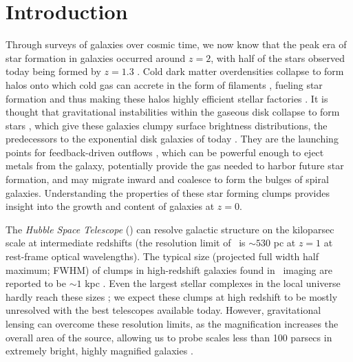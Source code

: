 \section{Introduction}

Through surveys of galaxies over cosmic time, we now know that the peak era of star formation in galaxies occurred around $z=2$, with half of the stars observed today being formed by $z=1.3$ \citep[][and references therein]{Madau:2014qd}. Cold dark matter overdensities collapse to form halos onto which cold gas can accrete in the form of filaments \citep{Keres:2005yq,Genzel:2006rt}, fueling star formation and thus making these halos highly efficient stellar factories \citep{Behroozi:2013vn}. It is thought that gravitational instabilities within the gaseous disk collapse to form stars \citep{Toomre:1964fr,Dekel:2006qf,Brooks:2009jk}, which give these galaxies clumpy surface brightness distributions, the predecessors to the exponential disk galaxies of today \citep{Elmegreen:2005xy,Elmegreen:2007qv,Elmegreen:2009nr,Forster-Schreiber:2011rz,Forster-Schreiber:2011sf,Guo:2011rm,Guo:2015zl}. They are the launching points for feedback-driven outflows \citep{Genzel:2008gf,Genzel:2011ys}, which can be powerful enough to eject metals from the galaxy, potentially provide the gas needed to harbor future star formation, and may migrate inward and coalesce to form the bulges of spiral galaxies. Understanding the properties of these star forming clumps provides insight into the growth and content of galaxies at $z=0$.

The {\it Hubble Space Telescope} (\hst) can resolve galactic structure on the kiloparsec scale at intermediate redshifts (the resolution limit of \hst\ is $\sim530$ pc at $z=1$ at rest-frame optical wavelengths). The typical size (projected full width half maximum; FWHM) of clumps in high-redshift galaxies found in \hst\ imaging are reported to be $\sim1$ kpc \citep{Elmegreen:2007qv,Forster-Schreiber:2011rz,Livermore:2012fk}. Even the largest stellar complexes in the local universe hardly reach these sizes \citep{Kennicutt:1984mz}; we expect these clumps at high redshift to be mostly unresolved with the best telescopes available today. However, gravitational lensing can overcome these resolution limits, as the magnification increases the overall area of the source, allowing us to probe scales less than 100 parsecs in extremely bright, highly magnified galaxies \citep{Jones:2010uq,Swinbank:2010zr,Livermore:2012fk,Livermore:2015ve}.

